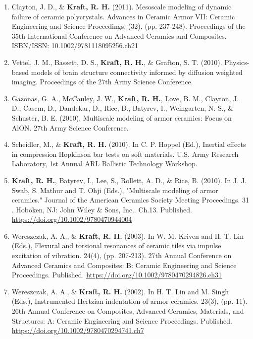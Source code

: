 \documentclass[a4paper,10pt]{article}
\begin{document}
\begin{enumerate}
  \item Clayton, J. D., \&
 \textbf{\textbf{Kraft,} R. H.} (2011). Mesoscale modeling of dynamic failure of ceramic polycrystals. Advances in Ceramic Armor VII: Ceramic Engineering and Science Proceedings. (32), (pp. 237-248). Proceedings of the 35th International Conference on Advanced Ceramics and Composites. ISBN/ISSN: 10.1002/9781118095256.ch21
  \item Vettel, J. M., Bassett, D. S., \textbf{\textbf{Kraft,} R. H.}, \&
 Grafton, S. T. (2010). Physics-based models of brain structure connectivity informed by diffusion weighted imaging. Proceedings of the 27th Army Science Conference.
  \item Gazonas, G. A., McCauley, J. W., \textbf{\textbf{Kraft,} R. H.}, Love, B. M., Clayton, J. D., Casem, D., Dandekar, D., Rice, B., Batyrev, I., Weingarten, N. S., \&
 Schuster, B. E. (2010). Multiscale modeling of armor ceramics: Focus on AlON. 27th Army Science Conference.
  \item Scheidler, M., \&
 \textbf{\textbf{Kraft,} R. H.} (2010). In C. P. Hoppel (Ed.), Inertial effects in compression Hopkinson bar tests on soft materials. U.S. Army Research Laboratory, 1st Annual ARL Ballistic Technology Workshop.
  \item \textbf{\textbf{Kraft,} R. H.}, Batyrev, I., Lee, S., Rollett, A. D., \&
 Rice, B. (2010). In J. J. Swab, S. Mathur and T. Ohji (Eds.), "Multiscale modeling of armor ceramics." Journal of the American Ceramics Society Meeting Proceedings. 31 . Hoboken, NJ: John Wiley \&
 Sons, Inc..  
Ch.13. Published. \url{https://doi.org/10.1002/9780470944004}
  \item Wereszczak, A. A., \&
 \textbf{\textbf{Kraft,} R. H.} (2003). In W. M. Kriven and H. T. Lin (Eds.), Flexural and torsional resonances of ceramic tiles via impulse excitation of vibration. 24(4), (pp. 207-213). 27th Annual Conference on Advanced Ceramics and Composites: B: Ceramic Engineering and Science Proceedings. Published. \url{https://doi.org/10.1002/9780470294826.ch31}
  \item Wereszczak, A. A., \&
 \textbf{\textbf{Kraft,} R. H.} (2002). In H. T. Lin and M. Singh (Eds.), Instrumented Hertzian indentation of armor ceramics. 23(3), (pp. 11). 26th Annual Conference on Composites, Advanced Ceramics, Materials, and Structures: A: Ceramic Engineering and Science Proceedings. Published. \url{https://doi.org/10.1002/9780470294741.ch7}

    \end{enumerate}
    
\end{document}
